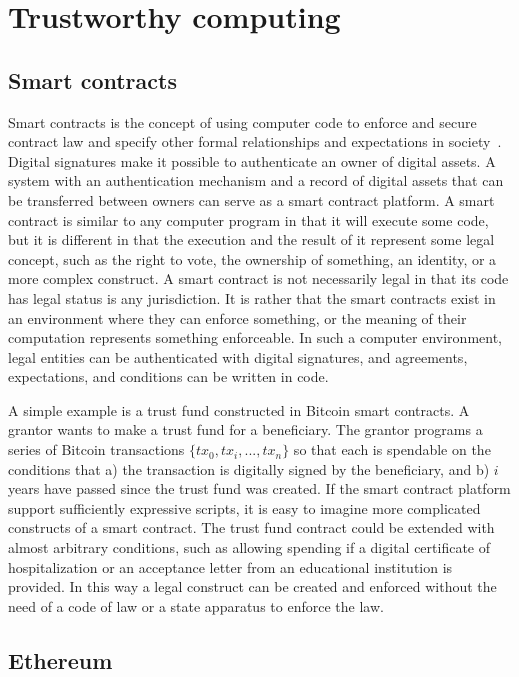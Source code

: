 \section{Trustworthy computing}
\label{sec:trustworthy}

\subsection{Smart contracts}

Smart contracts is the concept of using computer code to enforce and secure contract law and specify other formal relationships and expectations in  society~\cite{szabo_formalizing_1997}. Digital signatures make it possible to authenticate an owner of digital assets. A system with an authentication mechanism and a record of digital assets that can be transferred between owners can serve as a smart contract platform. A smart contract is similar to any computer program in that it will execute some code, but it is different in that the execution and the result of it represent some legal concept, such as the right to vote, the ownership of something, an identity, or a more complex construct. A smart contract is not necessarily legal in that its code has legal status is any jurisdiction. It is rather that the smart contracts exist in an environment where they can enforce something, or the meaning of their computation represents something enforceable. In such a computer environment, legal entities can be authenticated with digital signatures, and agreements, expectations, and conditions can be written in code.

A simple example is a trust fund constructed in Bitcoin smart contracts. A grantor wants to make a trust fund for a beneficiary. The grantor programs a series of Bitcoin transactions $\{tx_0, tx_i, ..., tx_n\}$ so that each is spendable on the conditions that a) the transaction is digitally signed by the beneficiary, and b) $i$ years have passed since the trust fund was created. If the smart contract platform support sufficiently expressive scripts, it is easy to imagine more complicated constructs of a smart contract. The trust fund contract could be extended with almost arbitrary conditions, such as allowing spending if a digital certificate of hospitalization or an acceptance letter from an educational institution is provided. In this way a legal construct can be created and enforced without the need of a code of law or a state apparatus to enforce the law.

\subsection{Ethereum}

